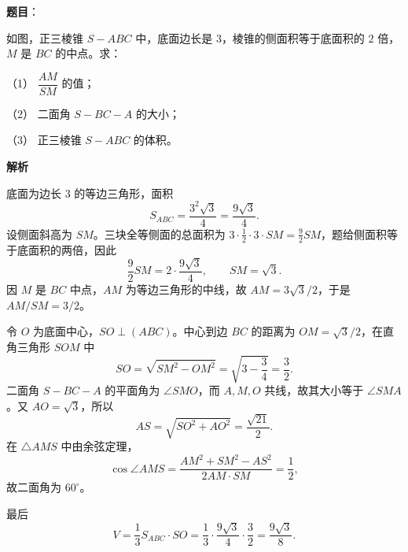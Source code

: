 \begin{answer}

\textbf{题目}：

如图，正三棱锥 $S-ABC$ 中，底面边长是 $3$，棱锥的侧面积等于底面积的 $2$ 倍，$M$ 是 $BC$ 的中点。求：

（1） $\dfrac{AM}{SM}$ 的值；

（2） 二面角 $S-BC-A$ 的大小；

（3） 正三棱锥 $S-ABC$ 的体积。
\nopagebreak[4]
\begin{center}\end{center}
\nopagebreak[4]
\textbf{解析}


底面为边长 $3$ 的等边三角形，面积
\nopagebreak[4]
\[
S_{ABC}=\frac{3^2\sqrt3}{4}=\frac{9\sqrt3}{4}.
\]
设侧面斜高为 $SM$。三块全等侧面的总面积为 $3\cdot\frac12\cdot3\cdot SM=\frac92SM$，题给侧面积等于底面积的两倍，因此
\nopagebreak[4]
\[
\frac92SM=2\cdot\frac{9\sqrt3}{4},\qquad SM=\sqrt3.
\]
因 $M$ 是 $BC$ 中点，$AM$ 为等边三角形的中线，故 $AM=3\sqrt3/2$，于是 $AM/SM=3/2$。


令 $O$ 为底面中心，$SO\perp(ABC)$。中心到边 $BC$ 的距离为 $OM=\sqrt3/2$，在直角三角形 $SOM$ 中
\nopagebreak[4]
\[
SO=\sqrt{SM^2-OM^2}=\sqrt{3-\frac34}=\frac32.
\]
二面角 $S-BC-A$ 的平面角为 $\angle SMO$，而 $A,M,O$ 共线，故其大小等于 $\angle SMA$。又 $AO=\sqrt3$，所以
\nopagebreak[4]
\[
AS=\sqrt{SO^2+AO^2}=\frac{\sqrt{21}}2.
\]
在 $\triangle AMS$ 中由余弦定理，
\nopagebreak[4]
\[
\cos\angle AMS=\frac{AM^2+SM^2-AS^2}{2AM\cdot SM}=\frac12,
\]
故二面角为 $60^\circ$。


最后
\nopagebreak[4]
\[
V=\frac13S_{ABC}\cdot SO
=\frac13\cdot\frac{9\sqrt3}{4}\cdot\frac32
=\frac{9\sqrt3}{8}.
\]




\end{answer}
